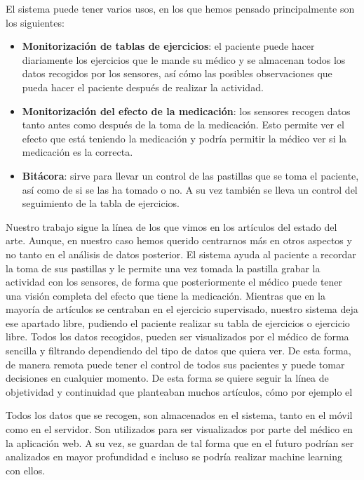 \documentclass[11pt,spanish]{article}
\begin{document}
El sistema puede tener varios usos, en los que hemos pensado principalmente son los siguientes:

\begin{itemize}
	\item {\bf Monitorización de tablas de ejercicios}: el paciente puede hacer diariamente los ejercicios que le mande su médico y se almacenan todos los datos recogidos por los sensores, así cómo las posibles observaciones que pueda hacer el paciente después de realizar la actividad.
    \item {\bf Monitorización del efecto de la medicación}: los sensores recogen datos tanto antes como después de la toma de la medicación. Esto permite ver el efecto que está teniendo la medicación y podría permitir la médico ver si la medicación es la correcta.
    \item {\bf Bitácora}: sirve para llevar un control de las pastillas que se toma el paciente, así como de si se las ha tomado o no. A su vez también se lleva un control del seguimiento de la tabla de ejercicios.
\end{itemize}

Nuestro trabajo sigue la línea de los que vimos en los artículos del estado del arte. Aunque, en nuestro caso hemos querido centrarnos más en otros aspectos y no tanto en el análisis de datos posterior. El sistema ayuda al paciente a recordar la toma de sus pastillas y le permite una vez tomada la pastilla grabar la actividad con los sensores, de forma que posteriormente el médico puede tener una visión completa del efecto que tiene la medicación. Mientras que en la mayoría de artículos se centraban en el ejercicio supervisado, nuestro sistema deja ese apartado libre, pudiendo el paciente realizar su tabla de ejercicios o ejercicio libre. Todos los datos recogidos, pueden ser visualizados por el médico de forma sencilla y filtrando dependiendo del tipo de datos que quiera ver. De esta forma, de manera remota puede tener el control de todos sus pacientes y puede tomar decisiones en cualquier momento. De esta forma se quiere seguir la línea de objetividad y continuidad que planteaban muchos artículos, cómo por ejemplo el \cite{resumen2}
\newline

Todos los datos que se recogen, son almacenados en el sistema, tanto en el móvil como en el servidor. Son utilizados para ser visualizados por parte del médico en la aplicación web. A su vez, se guardan de tal forma que en el futuro podrían ser analizados en mayor profundidad e incluso se podría realizar machine learning con ellos.
\newline
\end{document}
